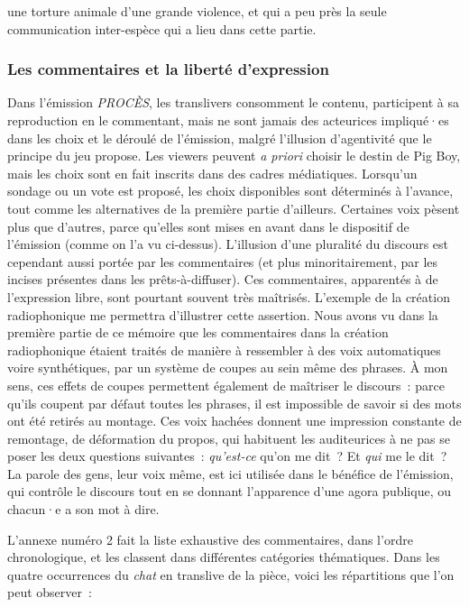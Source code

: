 \documentclass[
]{article}
\begin{document}
une torture animale d'une grande violence, et qui a peu près la seule communication inter-espèce qui a lieu dans cette partie.

\subsubsection{Les commentaires et la liberté d'expression}\label{les-commentaires-et-la-libertuxe9-dexpression}

Dans l'émission \emph{PROCÈS}, les translivers consomment le contenu, participent à sa reproduction en le commentant, mais ne sont jamais des acteurices impliqué·es dans les choix et le déroulé de l'émission, malgré l'illusion d'agentivité que le principe du jeu propose. Les viewers peuvent \emph{a priori} choisir le destin de Pig Boy, mais les choix sont en fait inscrits dans des cadres médiatiques. Lorsqu'un sondage ou un vote est proposé, les choix disponibles sont déterminés à l'avance, tout comme les alternatives de la première partie d'ailleurs. Certaines voix pèsent plus que d'autres, parce qu'elles sont mises en avant dans le dispositif de l'émission (comme on l'a vu ci-dessus). L'illusion d'une pluralité du discours est cependant aussi portée par les commentaires (et plus minoritairement, par les incises présentes dans les prêts-à-diffuser). Ces commentaires, apparentés à de l'expression libre, sont pourtant souvent très maîtrisés. L'exemple de la création radiophonique me permettra d'illustrer cette assertion. Nous avons vu dans la première partie de ce mémoire que les commentaires dans la création radiophonique étaient traités de manière à ressembler à des voix automatiques voire synthétiques, par un système de coupes au sein même des phrases. À mon sens, ces effets de coupes permettent également de maîtriser le discours~: parce qu'ils coupent par défaut toutes les phrases, il est impossible de savoir si des mots ont été retirés au montage. Ces voix hachées donnent une impression constante de remontage, de déformation du propos, qui habituent les auditeurices à ne pas se poser les deux questions suivantes~: \emph{qu'est-ce} qu'on me dit~? Et \emph{qui} me le dit~? La parole des gens, leur voix même, est ici utilisée dans le bénéfice de l'émission, qui contrôle le discours tout en se donnant l'apparence d'une agora publique, ou chacun·e a son mot à dire.

L'annexe numéro 2 fait la liste exhaustive des commentaires, dans l'ordre chronologique, et les classent dans différentes catégories thématiques. Dans les quatre occurrences du \emph{chat} en translive de la pièce, voici les répartitions que l'on peut observer~:
\end{document}
